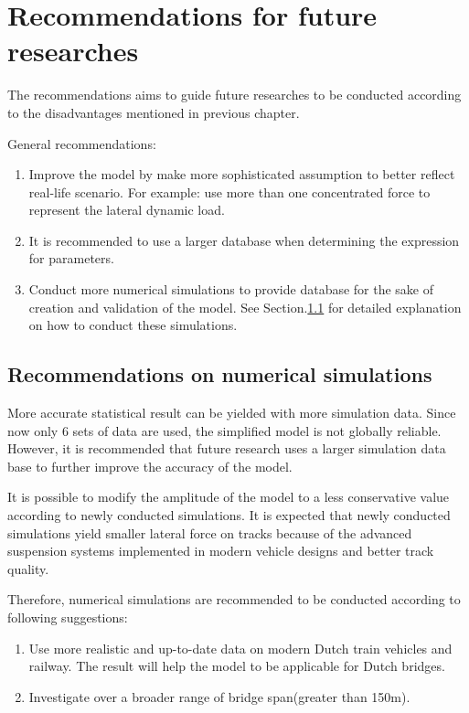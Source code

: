 
\chapter{Recommendations for future researches}\label{sec:recommendations}

The recommendations aims to guide future researches to be conducted according to the disadvantages mentioned in previous chapter.

General recommendations:

\begin{enumerate}
	\item Improve the model by make more sophisticated assumption to better reflect real-life scenario. For example: use more than one concentrated force to represent the lateral dynamic load. 
	\item It is recommended to use a larger database when determining the expression for parameters.
	\item Conduct more numerical simulations to provide database for the sake of creation and validation of the model. See Section.\ref{sec:recommendationsonsimulations} for detailed explanation on how to conduct these simulations.
\end{enumerate}

\section{Recommendations on numerical simulations}\label{sec:recommendationsonsimulations}

More accurate statistical result can be yielded with more simulation data. Since now only 6 sets of data are used, the simplified model is not globally reliable. However, it is recommended that future research uses a larger simulation data base to further improve the accuracy of the model.

It is possible to modify the amplitude of the model to a less conservative value according to newly conducted simulations. It is expected that newly conducted simulations yield smaller lateral force on tracks because of the advanced suspension systems implemented in modern vehicle designs and better track quality.

Therefore, numerical simulations are recommended to be conducted according to following suggestions:

\begin{enumerate}
    \item Use more realistic and up-to-date data on modern Dutch train vehicles and railway. The result will help the model to be applicable for Dutch bridges.
    \item Investigate over a broader range of bridge span(greater than 150m).
\end{enumerate}

